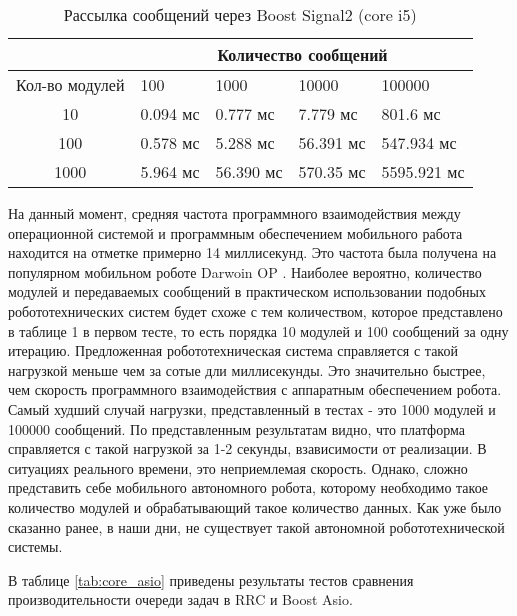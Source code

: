 \begin{table}[htb]
    \caption{\label{tab:core_signals2}Рассылка сообщений через Boost Signal2 (core i5)}
    \begin{center}
        \begin{tabularx}{\textwidth}{|c|X|X|X|X|}
            \hline
            & \multicolumn{4}{|c|}{Количество сообщений} \\
            \hline
            Кол-во модулей & 100   & 1000   & 10000   & 100000   \\
            \hline
            10             & 0.094 мс  & 0.777 мс   & 7.779 мс   & 801.6 мс   \\
            \hline
            100            & 0.578 мс  & 5.288 мс  & 56.391 мс  & 547.934 мс  \\
            \hline
            1000           & 5.964 мс & 56.390 мс & 570.35 мс & 5595.921 мс \\
            \hline
        \end{tabularx}
    \end{center}
\end{table}


На данный момент, средняя частота программного взаимодействия между операционной системой и программным обеспечением мобильного работа находится на отметке примерно 14 миллисекунд. Это частота была получена на популярном мобильном роботе Darwoin OP \cite{ha2011development}. Наиболее вероятно, количество модулей и передаваемых сообщений в практическом использовании подобных робототехнических систем будет схоже с тем количеством, которое представлено в таблице 1 в первом тесте, то есть порядка 10 модулей и 100 сообщений за одну итерацию. Предложенная робототехническая система справляется с такой нагрузкой меньше чем за сотые дли миллисекунды. Это значительно быстрее, чем скорость программного взаимодействия с аппаратным обеспечением робота. Самый худший случай нагрузки, представленный в тестах - это 1000 модулей и 100000 сообщений. По представленным результатам видно, что платформа справляется с такой нагрузкой за 1-2 секунды, взависимости от реализации. В ситуациях реального времени, это неприемлемая скорость. Однако, сложно представить себе мобильного автономного робота, которому необходимо такое количество модулей и обрабатывающий такое количество данных. Как уже было сказанно ранее, в наши дни, не существует такой автономной робототехнической системы.

В таблице \ref{tab:core_asio} приведены результаты тестов сравнения производительности очереди задач в RRC и Boost Asio. 

